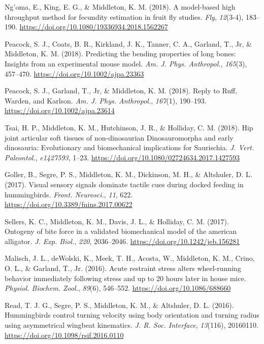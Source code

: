 \documentclass[11pt, a4paper]{awesome-cv}
\begin{document}
\leavevmode\hypertarget{ref-Ngoma2018-aw}{}%
Ng'oma, E., King, E. G., \& Middleton, K. M. (2018). A model-based high
throughput method for fecundity estimation in fruit fly studies.
\emph{Fly}, \emph{12}(3-4), 183--190.
\url{https://doi.org/10.1080/19336934.2018.1562267}

\leavevmode\hypertarget{ref-Peacock2018-ty}{}%
Peacock, S. J., Coats, B. R., Kirkland, J. K., Tanner, C. A., Garland,
T., Jr, \& Middleton, K. M. (2018). Predicting the bending properties of
long bones: Insights from an experimental mouse model. \emph{Am. J.
Phys. Anthropol.}, \emph{165}(3), 457--470.
\url{https://doi.org/10.1002/ajpa.23363}

\leavevmode\hypertarget{ref-Peacock2018-uz}{}%
Peacock, S. J., Garland, T., Jr, \& Middleton, K. M. (2018). Reply to
Ruff, Warden, and Karlson. \emph{Am. J. Phys. Anthropol.},
\emph{167}(1), 190--193. \url{https://doi.org/10.1002/ajpa.23614}

\leavevmode\hypertarget{ref-Tsai2018-xp}{}%
Tsai, H. P., Middleton, K. M., Hutchinson, J. R., \& Holliday, C. M.
(2018). Hip joint articular soft tissues of non-dinosaurian
Dinosauromorpha and early dinosauria: Evolutionary and biomechanical
implications for Saurischia. \emph{J. Vert. Paleontol.},
\emph{e1427593}, 1--23.
\url{https://doi.org/10.1080/02724634.2017.1427593}

\leavevmode\hypertarget{ref-Goller2017-es}{}%
Goller, B., Segre, P. S., Middleton, K. M., Dickinson, M. H., \&
Altshuler, D. L. (2017). Visual sensory signals dominate tactile cues
during docked feeding in hummingbirds. \emph{Front. Neurosci.},
\emph{11}, 622. \url{https://doi.org/10.3389/fnins.2017.00622}

\leavevmode\hypertarget{ref-Sellers2017-kj}{}%
Sellers, K. C., Middleton, K. M., Davis, J. L., \& Holliday, C. M.
(2017). Ontogeny of bite force in a validated biomechanical model of the
american alligator. \emph{J. Exp. Biol.}, \emph{220}, 2036--2046.
\url{https://doi.org/10.1242/jeb.156281}

\leavevmode\hypertarget{ref-Malisch2016-ht}{}%
Malisch, J. L., deWolski, K., Meek, T. H., Acosta, W., Middleton, K. M.,
Crino, O. L., \& Garland, T., Jr. (2016). Acute restraint stress alters
wheel-running behavior immediately following stress and up to 20 hours
later in house mice. \emph{Physiol. Biochem. Zool.}, \emph{89}(6),
546--552. \url{https://doi.org/10.1086/688660}

\leavevmode\hypertarget{ref-read_hummingbirds_2016}{}%
Read, T. J. G., Segre, P. S., Middleton, K. M., \& Altshuler, D. L.
(2016). Hummingbirds control turning velocity using body orientation and
turning radius using asymmetrical wingbeat kinematics. \emph{J. R. Soc.
Interface}, \emph{13}(116), 20160110.
\url{https://doi.org/10.1098/rsif.2016.0110}
\end{document}
